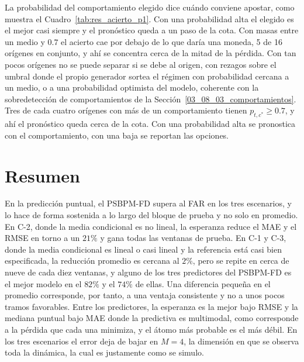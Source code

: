 La probabilidad del comportamiento elegido dice cuándo conviene apostar, como muestra el Cuadro~\ref{tab:res_acierto_p1}. Con una probabilidad alta el elegido es el mejor casi siempre y el pronóstico queda a un paso de la cota. Con masas entre un medio y $0.7$ el acierto cae por debajo de lo que daría una moneda, 5 de 16 orígenes en conjunto, y ahí se concentra cerca de la mitad de la pérdida. Con tan pocos orígenes no se puede separar si se debe al origen, con rezagos sobre el umbral donde el propio generador sortea el régimen con probabilidad cercana a un medio, o a una probabilidad optimista del modelo, coherente con la sobredetección de comportamientos de la Sección~\ref{03_08_03_comportamientos}. Tres de cada cuatro orígenes con más de un comportamiento tienen $p_{t,c^{*}} \ge 0.7$, y ahí el pronóstico queda cerca de la cota. Con una probabilidad alta se pronostica con el comportamiento, con una baja se reportan las opciones.

\section{Resumen}
\label{03_09}

En la predicción puntual, el PSBPM-FD supera al FAR en los tres escenarios, y lo hace de forma sostenida a lo largo del bloque de prueba y no solo en promedio. En C-2, donde la media condicional es no lineal, la esperanza reduce el MAE y el RMSE en torno a un $21\%$ y gana todas las ventanas de prueba. En C-1 y C-3, donde la media condicional es lineal o casi lineal y la referencia está casi bien especificada, la reducción promedio es cercana al $2\%$, pero se repite en cerca de nueve de cada diez ventanas, y alguno de los tres predictores del PSBPM-FD es el mejor modelo en el $82\%$ y el $74\%$ de ellas. Una diferencia pequeña en el promedio corresponde, por tanto, a una ventaja consistente y no a unos pocos tramos favorables. Entre los predictores, la esperanza es la mejor bajo RMSE y la mediana puntual bajo MAE donde la predictiva es multimodal, como corresponde a la pérdida que cada una minimiza, y el átomo más probable es el más débil. En los tres escenarios el error deja de bajar en $M = 4$, la dimensión en que se observa toda la dinámica, la cual es justamente como se simulo.\\

